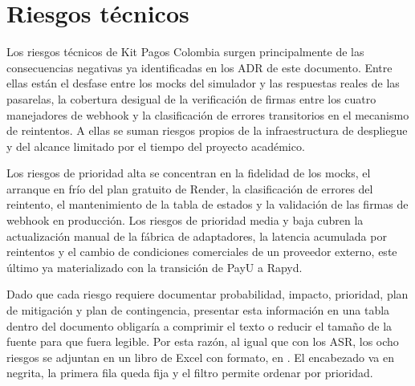 \section{Riesgos técnicos}
Los riesgos técnicos de Kit Pagos Colombia surgen principalmente de las consecuencias negativas ya identificadas en los ADR de este documento. Entre ellas están el desfase entre los mocks del simulador y las respuestas reales de las pasarelas, la cobertura desigual de la verificación de firmas entre los cuatro manejadores de webhook y la clasificación de errores transitorios en el mecanismo de reintentos. A ellas se suman riesgos propios de la infraestructura de despliegue y del alcance limitado por el tiempo del proyecto académico.

Los riesgos de prioridad alta se concentran en la fidelidad de los mocks, el arranque en frío del plan gratuito de Render, la clasificación de errores del reintento, el mantenimiento de la tabla de estados y la validación de las firmas de webhook en producción. Los riesgos de prioridad media y baja cubren la actualización manual de la fábrica de adaptadores, la latencia acumulada por reintentos y el cambio de condiciones comerciales de un proveedor externo, este último ya materializado con la transición de PayU a Rapyd.

Dado que cada riesgo requiere documentar probabilidad, impacto, prioridad, plan de mitigación y plan de contingencia, presentar esta información en una tabla dentro del documento obligaría a comprimir el texto o reducir el tamaño de la fuente para que fuera legible. Por esta razón, al igual que con los ASR, los ocho riesgos se adjuntan en un libro de Excel con formato, en . El encabezado va en negrita, la primera fila queda fija y el filtro permite ordenar por prioridad.

